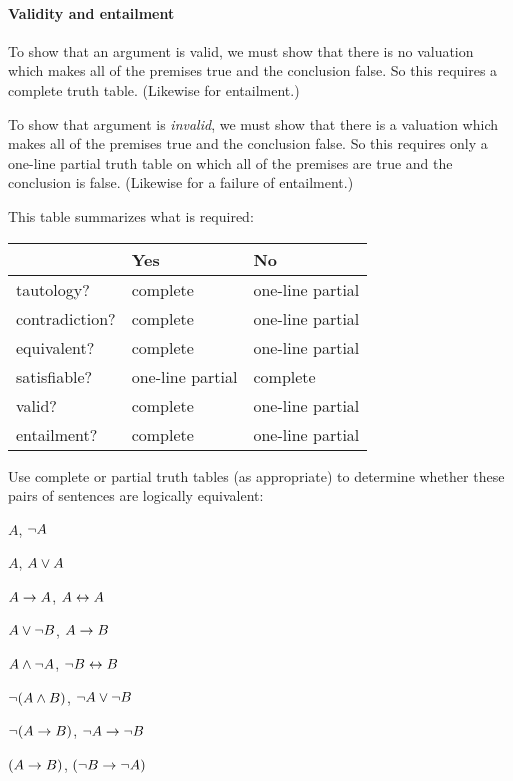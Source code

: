 \paragraph{Validity and entailment}
To show that an argument is valid, we must show that there is no valuation which makes all of the premises true and the conclusion false. So this  requires a complete truth table.  (Likewise for entailment.)

To show that argument is \emph{invalid}, we must show that there is a valuation which makes all of the premises true and the conclusion false. So this requires only a one-line partial truth table on which all of the premises are true and the conclusion is false. (Likewise for a failure of entailment.)

This table summarizes what is required:

\begin{center}
\begin{tabular}{l l l}
 & \textbf{Yes} & \textbf{No}\\
 \hline
tautology? & complete & one-line partial \\
contradiction? &  complete & one-line partial \\
equivalent? & complete  & one-line partial \\
satisfiable? & one-line partial & complete \\
valid? & complete & one-line partial \\
entailment? & complete & one-line partial\\
\end{tabular}
\end{center}
\label{table.CompleteVsPartial}


\practiceproblems

\problempart
\label{pr.TT.equiv3}
Use complete or partial truth tables (as appropriate) to determine whether these pairs of sentences are logically equivalent:
\begin{compactlist}
\item $A$, $\neg A$ %
\item $A$, $A \vee A$ %
\item $A\rightarrow A$, $A \leftrightarrow A$ %
\item $A \vee \neg B$, $A\rightarrow B$ %
\item $A \wedge \neg A$, $\neg B \leftrightarrow B$ %
\item $\neg(A \wedge B)$, $\neg A \vee \neg B$ %
\item $\neg(A \rightarrow B)$, $\neg A \rightarrow \neg B$ %
\item $(A \rightarrow B)$, $(\neg B \rightarrow \neg A)$ %
\end{compactlist}

